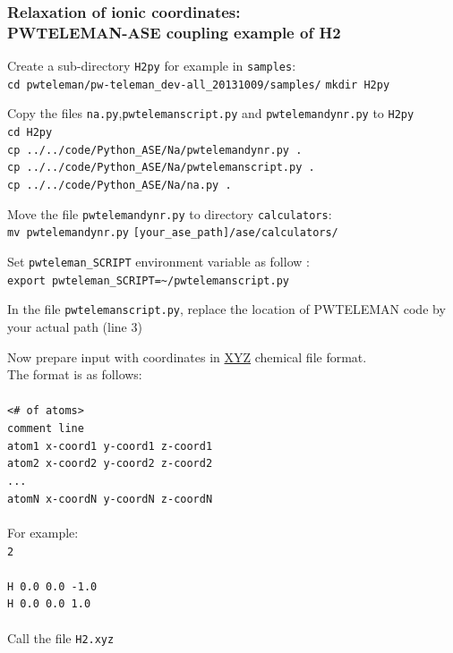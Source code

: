 \documentclass[10pt]{beamer}
\begin{document}
\begin{frame}
\frametitle{ Relaxation of ionic coordinates:\\
PWTELEMAN-ASE coupling example of H2}
\begin{enumerate}
\item \small{Create a sub-directory {\tt H2py} for example in {\tt samples}:\\
{\tt cd pwteleman/pw-teleman\_dev-all\_20131009/samples/}
{\tt mkdir H2py}
\item Copy the files {\tt na.py},{\tt pwtelemanscript.py} and {\tt pwtelemandynr.py} to {\tt H2py}\\
{\tt cd H2py}\\
{\tt cp ../../code/Python\_ASE/Na/pwtelemandynr.py .}\\
{\tt cp ../../code/Python\_ASE/Na/pwtelemanscript.py .}\\
{\tt cp ../../code/Python\_ASE/Na/na.py .}\\
\item Move the file {\tt pwtelemandynr.py} to directory {\tt calculators}:\\
{\tt mv pwtelemandynr.py} {\tt [your\_ase\_path]/ase/calculators/}\\
\item Set {\tt pwteleman\_SCRIPT} environment variable as follow :\\ 
{\tt export pwteleman\_SCRIPT=\textasciitilde/pwtelemanscript.py}
\item In the file {\tt pwtelemanscript.py}, replace the location of PWTELEMAN code by your actual path (line 3)}
\end{enumerate}
\end{frame}

\begin{frame}
Now prepare input with coordinates in \href{http://openbabel.org/wiki/XYZ\_(format)}{XYZ} chemical file format.\\
The format is as follows:\\
~\\
{\tt <# of atoms>\\
comment line\\
atom1 x-coord1 y-coord1 z-coord1\\
atom2 x-coord2 y-coord2 z-coord2\\
...\\
atomN x-coordN y-coordN z-coordN}\\
~\\
For example:\\
{\tt 2\\
~~\\
H	0.0	0.0	-1.0\\
H	0.0	0.0	1.0\\}
~\\
Call the file {\tt H2.xyz}
\end{frame}
\end{document}
